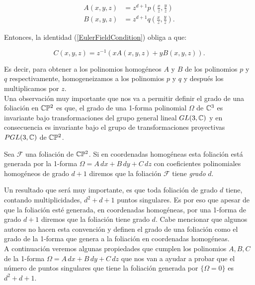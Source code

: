 \begin{align}
A(x,y,z) &=z^{d+1}p(\tfrac{x}{z},\tfrac{y}{z})\\
B(x,y,z) &=z^{d+1}q(\tfrac{x}{z},\tfrac{y}{z}).
\end{align}

\noindent Entonces, la identidad (\ref{EulerFieldCondition}) obliga a que:

\begin{equation}
C(x,y,z) = z^{-1}(xA(x,y,z)+yB(x,y,z)).
\end{equation}

\noindent Es decir, para obtener a los polinomios homogéneos $A$ y $B$ de los polinomios $p$
y $q$ respectivamente, homogeneizamos a los polinomios $p$ y $q$ y después los multiplicamos por $z$.\\

Una observación muy importante que nos va a permitir definir el grado de una foliación en $\mathbb{C}\mathbb{P}^{2}$ es que, el grado de una 1-forma polinomial $\Omega$ de $\mathbb{C}^{3}$ es invariante bajo transformaciones del grupo general lineal $GL(3,\mathbb{C})$ y en consecuencia es invariante bajo el grupo de transformaciones proyectivas $PGL(3,\mathbb{C})$ de $\mathbb{C}\mathbb{P}^{2}$.  

\begin{defn}
\label{GradoDeUnaFoliacion}
Sea $\mathcal{F}$ una foliación de $\mathbb{C}\mathbb{P}^{2}$. Si en coordenadas homogéneas esta foliación está generada por la 1-forma $\Omega=A\, dx+B\, dy+ C\, dz$ con coeficientes polinomiales homogéneos de grado $d+1$ diremos que la foliación $\mathcal{F}$ tiene \emph{grado} $d$. 
\end{defn} 

Un resultado que será muy importante, es que toda foliación de grado $d$ tiene, contando multiplicidades, $d^{2}+d+1$ puntos singulares. Es por eso que apesar de que la foliación esté generada, en coordenadas homogéneas, por una 1-forma de grado $d+1$ diremos que la foliación tiene grado $d$. Cabe mencionar que algunos autores no hacen esta convención y definen el grado de una foliación como el grado de la 1-forma que genera a la foliación en coordenadas homogéneas.\\

A continuación veremos algunas propiedades que cumplen los polinomios $A,B,C$ de la 1-forma $\Omega=A\, dx+B\, dy+C\, dz$ que nos van a ayudar a probar que el número de puntos singulares que tiene la foliación generada por $\{ \Omega=0\}$ es $d^{2}+d+1$.\\

